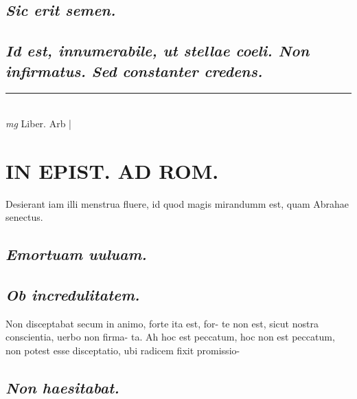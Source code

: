 \documentclass{article}
\begin{document}
\begin{pages}
\subsection*{\textit{Sic erit semen. }}
{}
\subsection*{\textit{Id est, innumerabile, ut stellae coeli.  Non infirmatus. Sed constanter credens.  }}
\vspace{0.5cm}\noindent
\vspace{0.2cm}\rule{1cm}{0.2pt}\\ 
\hspace{0.2cm}\textit{mg}
\footnotesize Liber. Arb 
\normalsize| 
\section*{IN EPIST. AD ROM.  }
\marginpar{[ p.45 ]}\pstart Desierant iam illi menstrua fluere, id quod magis mirandumm est, quam Abrahae senectus.   \pend
{}
{}
\subsection*{\textit{Emortuam uuluam. }}
{}
\subsection*{\textit{Ob incredulitatem.  }}\pstart Non disceptabat secum in animo, forte ita est, for- te non est, sicut nostra conscientia, uerbo non firma- ta. Ah hoc est peccatum, hoc non est peccatum, non potest esse disceptatio, ubi radicem fixit promissio-  \pend
{}
{}
\subsection*{\textit{Non haesitabat.  }}
{}

\end{pages}
\end{document}
